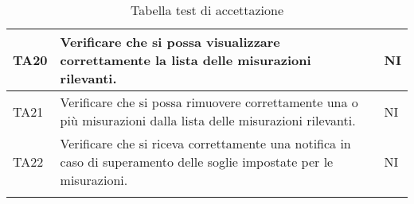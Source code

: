 \begin{longtable}{|C{1.9cm}|L{5cm}|C{2cm}|}
    TA20 & Verificare che si possa visualizzare correttamente la lista delle misurazioni rilevanti. & NI \\
    \hline
    
    TA21 & Verificare che si possa rimuovere correttamente una o più misurazioni dalla lista delle misurazioni rilevanti. & NI \\
    \hline
    
    TA22 & Verificare che si riceva correttamente una notifica in caso di superamento delle soglie impostate per le misurazioni. & NI \\
    \hline
    
    \caption{Tabella test di accettazione}
\end{longtable}

\pagebreak